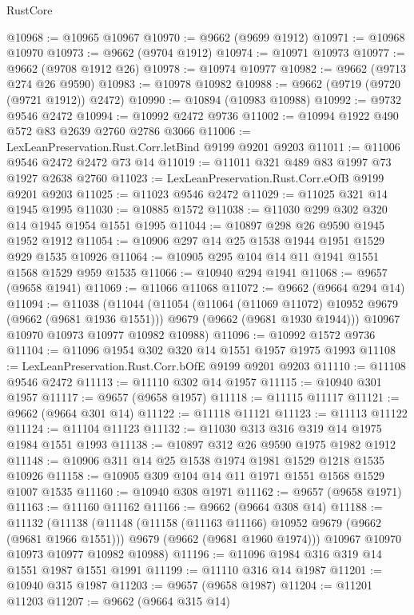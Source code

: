 \begin{lexlean}{RustCore}
\begin{coremodule}
@10968 := @10965 @10967
@10970 := @9662 (@9699 @1912)
@10971 := @10968 @10970
@10973 := @9662 (@9704 @1912)
@10974 := @10971 @10973
@10977 := @9662 (@9708 @1912 @26)
@10978 := @10974 @10977
@10982 := @9662 (@9713 @274 @26 @9590)
@10983 := @10978 @10982
@10988 := @9662 (@9719 (@9720 (@9721 @1912)) @2472)
@10990 := @10894 (@10983 @10988)
@10992 := @9732 @9546 @2472
@10994 := @10992 @2472 @9736
@11002 := @10994 @1922 @490 @572 @83 @2639 @2760 @2786 @3066
@11006 := LexLeanPreservation.Rust.Corr.letBind @9199 @9201 @9203
@11011 := @11006 @9546 @2472 @2472 @73 @14
@11019 := @11011 @321 @489 @83 @1997 @73 @1927 @2638 @2760
@11023 := LexLeanPreservation.Rust.Corr.eOfB @9199 @9201 @9203
@11025 := @11023 @9546 @2472
@11029 := @11025 @321 @14 @1945 @1995
@11030 := @10885 @1572
@11038 := @11030 @299 @302 @320 @14 @1945 @1954 @1551 @1995
@11044 := @10897 @298 @26 @9590 @1945 @1952 @1912
@11054 := @10906 @297 @14 @25 @1538 @1944 @1951 @1529 @929 @1535 @10926
@11064 := @10905 @295 @104 @14 @11 @1941 @1551 @1568 @1529 @959 @1535
@11066 := @10940 @294 @1941
@11068 := @9657 (@9658 @1941)
@11069 := @11066 @11068
@11072 := @9662 (@9664 @294 @14)
@11094 := @11038
    (@11044
      (@11054
        (@11064 (@11069 @11072) @10952 @9679 (@9662 (@9681 @1936 @1551)))
        @9679
        (@9662 (@9681 @1930 @1944)))
      @10967
      @10970
      @10973
      @10977
      @10982
      @10988)
@11096 := @10992 @1572 @9736
@11104 := @11096 @1954 @302 @320 @14 @1551 @1957 @1975 @1993
@11108 := LexLeanPreservation.Rust.Corr.bOfE @9199 @9201 @9203
@11110 := @11108 @9546 @2472
@11113 := @11110 @302 @14 @1957
@11115 := @10940 @301 @1957
@11117 := @9657 (@9658 @1957)
@11118 := @11115 @11117
@11121 := @9662 (@9664 @301 @14)
@11122 := @11118 @11121
@11123 := @11113 @11122
@11124 := @11104 @11123
@11132 := @11030 @313 @316 @319 @14 @1975 @1984 @1551 @1993
@11138 := @10897 @312 @26 @9590 @1975 @1982 @1912
@11148 := @10906 @311 @14 @25 @1538 @1974 @1981 @1529 @1218 @1535 @10926
@11158 := @10905 @309 @104 @14 @11 @1971 @1551 @1568 @1529 @1007 @1535
@11160 := @10940 @308 @1971
@11162 := @9657 (@9658 @1971)
@11163 := @11160 @11162
@11166 := @9662 (@9664 @308 @14)
@11188 := @11132
    (@11138
      (@11148
        (@11158 (@11163 @11166) @10952 @9679 (@9662 (@9681 @1966 @1551)))
        @9679
        (@9662 (@9681 @1960 @1974)))
      @10967
      @10970
      @10973
      @10977
      @10982
      @10988)
@11196 := @11096 @1984 @316 @319 @14 @1551 @1987 @1551 @1991
@11199 := @11110 @316 @14 @1987
@11201 := @10940 @315 @1987
@11203 := @9657 (@9658 @1987)
@11204 := @11201 @11203
@11207 := @9662 (@9664 @315 @14)

\end{coremodule}
\end{lexlean}

